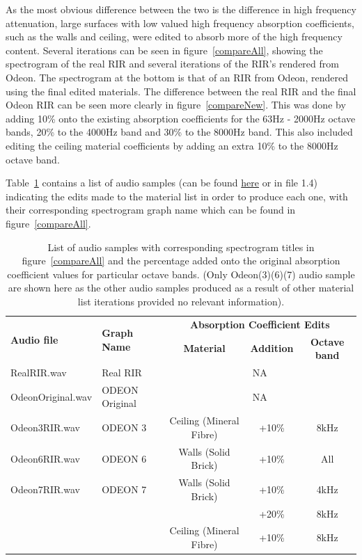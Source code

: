 \documentclass[../../main.tex]{subfiles}
\begin{document}
			 As the most obvious difference between the two is the difference in high frequency attenuation, large surfaces with low valued high frequency absorption coefficients, such as the walls and ceiling, were edited to absorb more of the high frequency content. Several iterations can be seen in figure~\ref{compareAll}, showing the spectrogram of the real \ac{RIR} and several iterations of the \ac{RIR}'s rendered from Odeon. The spectrogram at the bottom is that of an \ac{RIR} from Odeon, rendered using the final edited materials. The difference between the real RIR and the final Odeon \ac{RIR} can be seen more clearly in figure~\ref{compareNew}. This was done by adding 10\% onto the existing absorption coefficients for the 63Hz - 2000Hz octave bands, 20\% to the 4000Hz band and 30\% to the 8000Hz band. This also included editing the ceiling material coefficients by adding an extra 10\% to the 8000Hz octave band.

			Table~\ref{materialTableSamples} contains a list of audio samples (can be found \href{http://lt669.github.io/pages/audioSamples.html}{here} or in file 1.4) indicating the edits made to the material list in order to produce each one, with their corresponding spectrogram graph name which can be found in figure~\ref{compareAll}.

			\begin{table}[h]
				\centering
				\begin{tabular}{|l | l | c | c | c |} 
					\hline
					\multirow{2}{*}{\textbf{Audio file}} & \multirow{2}{*}{\textbf{Graph Name}} & \multicolumn{3}{c|}{\textbf{Absorption Coefficient Edits}} \\ \cline{3-5}
					 & & \textbf{Material} & \textbf{Addition} & \textbf{Octave band} \\ \hline
					RealRIR.wav & Real RIR & \multicolumn{3}{c|}{NA}\\ \hline
					OdeonOriginal.wav & ODEON Original & \multicolumn{3}{c|}{NA}\\ \hline
					Odeon3RIR.wav & ODEON 3 & Ceiling (Mineral Fibre) & +10\% & 8kHz\\ \hline
					Odeon6RIR.wav & ODEON 6 & Walls (Solid Brick) & +10\% & All\\ \hline
					Odeon7RIR.wav & ODEON 7 & Walls (Solid Brick) & +10\% & 4kHz\\ 
					& & & +20\% & 8kHz \\
					& & Ceiling (Mineral Fibre) & +10\% & 8kHz\\ \hline
				\end{tabular}
				\caption{List of audio samples with corresponding spectrogram titles in figure~\ref{compareAll} and the percentage added onto the original absorption coefficient values for particular octave bands. (Only Odeon(3)(6)(7) audio sample are shown here as the other audio samples produced as a result of other material list iterations provided no relevant information).}
				\label{materialTableSamples}
			\end{table}
\end{document}
